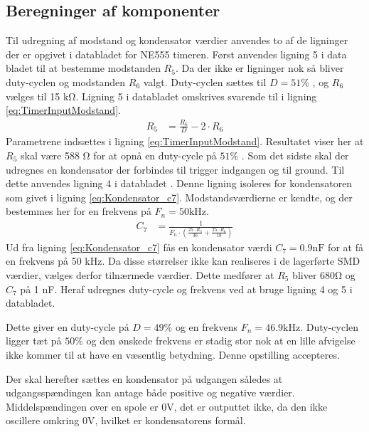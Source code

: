 \subsection{Beregninger af komponenter}
Til udregning af modstand og kondensator værdier anvendes to af de ligninger der er opgivet i databladet for NE555 timeren. 
Først anvendes ligning 5 i data bladet til at bestemme modstanden $R_5$. 
Da der ikke er ligninger nok så bliver duty-cyclen og modstanden $R_6$ valgt. 
Duty-cyclen sættes til $D = 51\%$  , og $R_6$ vælges til 15 \si{\kilo\ohm}. 
Ligning 5 \cite[Side 11.]{NE555} i databladet omskrives svarende til i ligning \ref{eq:TimerInputModstand}.
\begin{align}
R_5 & = \frac{R_6}{D} - 2 \cdot R_6 \label{eq:TimerInputModstand}
\end{align}
Parametrene indsættes i ligning \ref{eq:TimerInputModstand}.
Resultatet viser her at $R_5$ skal være 588 \si{\ohm}  for at opnå en duty-cycle på $51 \%$ .
Som det sidste skal der udregnes en kondensator der forbindes til trigger indgangen og til ground. 
Til dette anvendes ligning 4 i databladet \cite[Side 11]{NE555}. Denne ligning isoleres for kondensatoren som givet i ligning \ref{eq:Kondensator_c7}.
Modstandsværdierne er kendte, og der bestemmes her for en frekvens på $F_n = 50 \si{\kilo\hertz}$.
\begin{align}
	C_7 & = \frac{1}{F_n \cdot \left( \frac{25 \cdot R_5 }{36} + \frac{25 \cdot R_6}{18} \right) \label{eq:Kondensator_c7}}
\end{align}
Ud fra ligning \ref{eq:Kondensator_c7} fås en kondensator værdi $C_7 = 0.9\si{\nano\farad}$ for at få en frekvens på 50 \si{\kilo\hertz}. 
Da disse størrelser ikke kan realiseres i de lagerførte SMD værdier, vælges derfor tilnærmede værdier. 
Dette medfører at $R_5$ bliver $680 \si{\ohm}$ og $C_7$ på 1 \si{\nano\farad}. 
Heraf udregnes duty-cycle og frekvens ved at bruge ligning 4 og 5 i databladet. \cite[Side 11.]{NE555}

Dette giver en duty-cycle på $D = 49 \%$ og en frekvens $F_n = 46.9 \si{\kilo\hertz}$. 
Duty-cyclen ligger tæt på $50 \%$ og den ønskede frekvens er stadig stor nok at en lille afvigelse ikke kommer til at have en væsentlig betydning. Denne opstilling accepteres.

Der skal herefter sættes en kondensator på udgangen således at udgangsspændingen kan antage både positive og negative værdier. 
Middelspændingen over en spole er $0 \si{\volt}$, det er outputtet ikke, da den ikke oscillere omkring $0 \si{\volt}$, hvilket er kondensatorens formål. 

